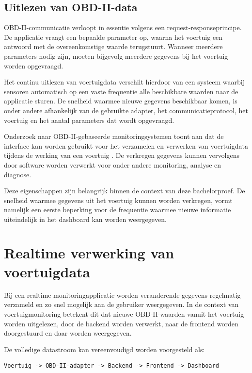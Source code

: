 \subsection{Uitlezen van OBD-II-data}
OBD-II-communicatie verloopt in essentie volgens een request-responseprincipe.
De applicatie vraagt een bepaalde parameter op, waarna het voertuig een antwoord
met de overeenkomstige waarde terugstuurt. Wanneer meerdere parameters nodig
zijn, moeten bijgevolg meerdere gegevens bij het voertuig worden opgevraagd.

Het continu uitlezen van voertuigdata verschilt hierdoor van een systeem
waarbij sensoren automatisch op een vaste frequentie alle beschikbare waarden
naar de applicatie sturen. De snelheid waarmee nieuwe gegevens beschikbaar
komen, is onder andere afhankelijk van de gebruikte adapter, het
communicatieprotocol, het voertuig en het aantal parameters dat wordt
opgevraagd.

Onderzoek naar OBD-II-gebaseerde monitoringsystemen toont aan dat de interface
kan worden gebruikt voor het verzamelen en verwerken van voertuigdata tijdens
de werking van een voertuig \autocite{SageJournals2013,RIMPAS202055}. De
verkregen gegevens kunnen vervolgens door software worden verwerkt voor onder
andere monitoring, analyse en diagnose.

Deze eigenschappen zijn belangrijk binnen de context van deze bachelorproef.
De snelheid waarmee gegevens uit het voertuig kunnen worden verkregen, vormt
namelijk een eerste beperking voor de frequentie waarmee nieuwe informatie
uiteindelijk in het dashboard kan worden weergegeven.

\section{Realtime verwerking van voertuigdata}
Bij een realtime monitoringapplicatie worden veranderende gegevens regelmatig
verzameld en zo snel mogelijk aan de gebruiker weergegeven. In de context van
voertuigmonitoring betekent dit dat nieuwe OBD-II-waarden vanuit het voertuig
worden uitgelezen, door de backend worden verwerkt, naar de frontend worden
doorgestuurd en daar worden weergegeven.

De volledige datastroom kan vereenvoudigd worden voorgesteld als:

\begin{verbatim}
Voertuig -> OBD-II-adapter -> Backend -> Frontend -> Dashboard
\end{verbatim}


